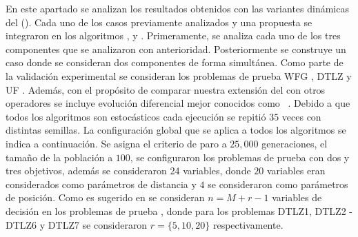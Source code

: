 En este apartado se analizan los resultados obtenidos con las variantes dinámicas del \SBX{} (\DSBX{}).
%
Cada uno de los casos previamente analizados y una propuesta se integraron en los algoritmos \NSGAII{}, \MOEAD{} y \SMSEMOA{}.
%
Primeramente, se analiza cada uno de los tres componentes que se analizaron con anterioridad.
%
Posteriormente se construye un caso donde se consideran dos componentes de forma simultánea.
%
Como parte de la validación experimental se consideran los problemas de prueba WFG \cite{Joel:WFG}, DTLZ \cite{Joel:DTLZ_2} y UF \cite{zhang2009performance}.
%
Además, con el propósito de comparar nuestra extensión del \SBX{} con otros operadores se incluye evolución diferencial mejor conocidos como \DEMO{}~\cite{tuvsar2007differential}.
Debido a que todos los algoritmos son estocásticos cada ejecución se repitió $35$ veces con distintas semillas.
%
La configuración global que se aplica a todos los algoritmos se indica a continuación.
%
Se asigna el criterio de paro a $25,000$ generaciones, el tamaño de la población a $100$, se configuraron los problemas de prueba \WFG{} con dos y tres objetivos, además se consideraron 24 variables, donde $20$ variables eran considerados como parámetros de distancia y $4$ se consideraron como parámetros de posición.
%
Como es sugerido en \cite{Joel:DTLZ_2} se consideran $n=M+r-1$ variables de decisión en los problemas de prueba \DTLZ{}, donde para los problemas DTLZ1, DTLZ2 - DTLZ6 y DTLZ7 se consideraron $r=\{5, 10, 20\}$  respectivamente.

